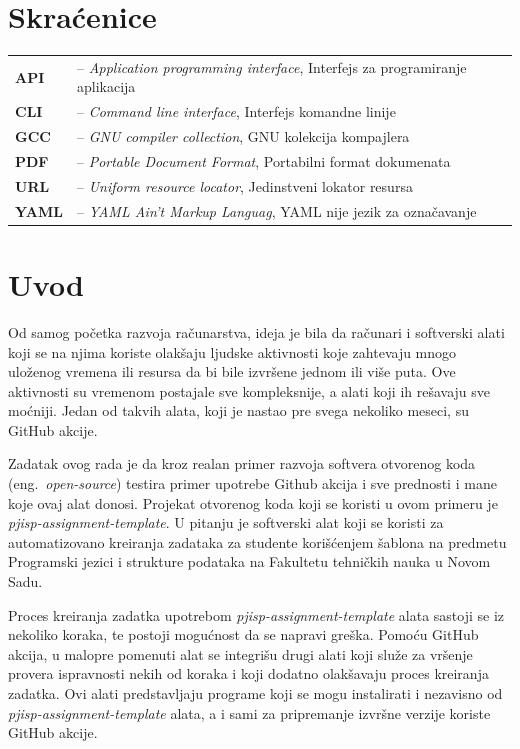 \documentclass[12pt]{report}
\renewcommand{\chaptermark}[1]{\markboth{#1}{}}
\newcommand\frontmatter{
    \cleardoublepage{}
    \pagenumbering{Roman}
    \setlength{\parskip}{0pt}
}
\newcommand\mainmatter{
    \cleardoublepage{}
    \pagenumbering{arabic}
    \setlength{\parskip}{2mm}
    \titleformat{\chapter}{\normalfont\Large\bf\sffamily\raggedleft}{\thechapter.}{12pt}{}
}
\begin{document}
\frontmatter{}

\renewcommand{\MakeUppercase}[1]{#1}
\tableofcontents

\listoffigures

\chapter*{Skraćenice}
\chaptermark{Skraćenice}
\begin{tabular}{ l l }
    \textbf{API} & -- \textit{Application programming interface}, Interfejs za programiranje aplikacija \\
    \textbf{CLI} & -- \textit{Command line interface}, Interfejs komandne linije \\
    \textbf{GCC} & -- \textit{GNU compiler collection}, GNU kolekcija kompajlera \\
    \textbf{PDF} & -- \textit{Portable Document Format}, Portabilni format dokumenata \\
    \textbf{URL} & -- \textit{Uniform resource locator}, Jedinstveni lokator resursa \\
    \textbf{YAML} & -- \textit{YAML Ain't Markup Languag}, YAML nije jezik za označavanje \\
\end{tabular}

\mainmatter{}
\chapter{Uvod}
Od samog početka razvoja računarstva, ideja je bila da računari i softverski alati koji se na njima koriste olakšaju ljudske aktivnosti koje zahtevaju mnogo uloženog vremena ili resursa da bi bile izvršene jednom ili više puta. Ove aktivnosti su vremenom postajale sve kompleksnije, a alati koji ih rešavaju sve moćniji. Jedan od takvih alata, koji je nastao pre svega nekoliko meseci, su GitHub akcije.

Zadatak ovog rada je da kroz realan primer razvoja softvera otvorenog koda (eng.\ \textit{open-source}) testira primer upotrebe Github akcija i sve prednosti i mane koje ovaj alat donosi. Projekat otvorenog koda koji se koristi u ovom primeru je \textit{pjisp-assignment-template}. U pitanju je softverski alat koji se koristi za automatizovano kreiranja zadataka za studente korišćenjem šablona na predmetu Programski jezici i strukture podataka na Fakultetu tehničkih nauka u Novom Sadu.

Proces kreiranja zadatka upotrebom \textit{pjisp-assignment-template} alata sastoji se iz nekoliko koraka, te postoji mogućnost da se napravi greška. Pomoću GitHub akcija, u malopre pomenuti alat se integrišu drugi alati koji služe za vršenje provera ispravnosti nekih od koraka i koji dodatno olakšavaju proces kreiranja zadatka. Ovi alati predstavljaju programe koji se mogu instalirati i nezavisno od \textit{pjisp-assignment-template} alata, a i sami za pripremanje izvršne verzije koriste GitHub akcije.
\end{document}
